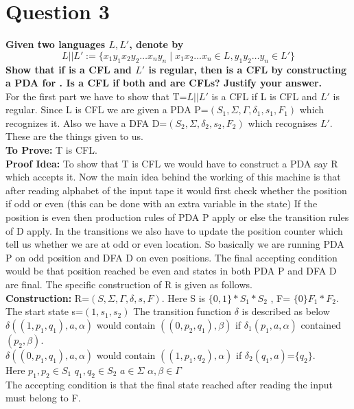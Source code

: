 \documentclass{article}
\begin{document}
\section{Question 3}
\textbf{Given two languages $L, L'$, denote by $$L||L' := \{x_1y_1x_2y_2 \dots x_ny_n \mid x_1x_2 \dots x_n \in L, y_1y_2\dots y_n \in L'\}$$ Show that if  is a CFL and $L'$ is regular, then  is a CFL by constructing a PDA for . Is  a CFL if both  and  are CFLs? Justify your answer.}\\
\newline 
For the first part we have to show that T=$L||L'$ is a CFL if L is CFL and $L'$ is regular. Since L is CFL we are given a PDA P=$(S_1,\Sigma,\Gamma,\delta_1,s_1,F_1)$ which recognizes it. Also we have a DFA D=$(S_2,\Sigma,\delta_2,s_2,F_2)$ which recognises $L'$. These are the things given to us.\\
\textbf{To Prove:} T is CFL.\\
\textbf{Proof Idea:} To show that T is CFL we would have to construct a PDA say R which accepts it. Now the main idea behind the working of this machine is that after reading alphabet of the input tape it would first check whether the position if odd or even (this can be done with an extra variable in the state) If the position is even then production rules of PDA P apply or else the transition rules of D apply. In the transitions we also have to update the position counter which tell us whether we are at odd or even location. So basically we are running PDA P on odd position and DFA D on even positions. The final accepting condition would be that position reached be even and states in both PDA P and DFA D are final. The specific construction of R is given as follows.\\
\textbf{Construction:} R=$(S,\Sigma,\Gamma,\delta,s,F)$. Here S is  $\{0,1\}*S_1 * S_2$ , F= $\{0\}F_1 * F_2$. The start state s=$(1,s_1,s_2)$ The transition function $\delta$ is described as below\\
$\delta((1,p_1 ,q_1),a,\alpha)$ would contain $((0,p_2,q_1),\beta)$ if $\delta_1(p_1,a,\alpha)$ contained $(p_2,\beta)$.\\
$\delta((0,p_1 ,q_1),a,\alpha)$ would contain $((1,p_1,q_2),\alpha)$ if $\delta_2(q_1,a)$=$\{q_2\}$.\\
Here $p_1,p_2 \in S_1$  $q_1,q_2 \in S_2$  $a \in \Sigma$  $\alpha , \beta \in \Gamma$\\
The accepting condition is that the final state reached after reading the input must belong to F.\\
\end{document}
